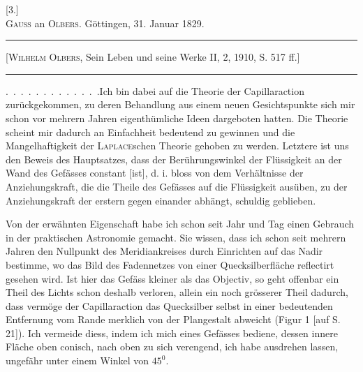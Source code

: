 \clearpage\begingroup{}
\begin{center}
[3.]\\[.7em]
\textsc{Gauss} an \textsc{Olbers}. Göttingen, 31. Januar 1829.
\par\medskip\rule{\textwidth}{.35pt}\par
{\small [\textsc{Wilhelm Olbers}, Sein Leben und seine Werke II, 2, 1910, S. 517 ff.]}\par
\rule{\textwidth}{.35pt}
\end{center}
\noindent .\ .\ .\ .\ .\ .\ .\ .\ .\ .\ .\ .\ .\quad Ich bin dabei auf die Theorie der Capillaraction
zurückgekommen, zu deren Behandlung aus einem neuen Gesichtspunkte sich
mir schon vor mehrern Jahren eigenthümliche Ideen dargeboten hatten. Die
Theorie scheint mir dadurch an Einfachheit bedeutend zu gewinnen und die
Mangelhaftigkeit der \textsc{Laplace}schen Theorie gehoben zu werden. Letztere
ist uns den Beweis des Hauptsatzes, dass der Berührungswinkel der Flüssigkeit
an der Wand des Gefässes constant [ist], d. i. bloss von dem Verhältnisse
der Anziehungskraft, die die Theile des Gefässes auf die Flüssigkeit ausüben,
zu der Anziehungskraft der erstern gegen einander abhängt, schuldig
geblieben.

Von der erwähnten Eigenschaft habe ich schon seit Jahr und Tag einen
Gebrauch in der praktischen Astronomie gemacht. Sie wissen, dass ich schon
seit mehrern Jahren den Nullpunkt des Meridiankreises durch Einrichten auf
das Nadir bestimme, wo das Bild des Fadennetzes von einer Quecksilberfläche
reflectirt gesehen wird. Ist hier das Gefäss kleiner als das Objectiv, so geht
offenbar ein Theil des Lichts schon deshalb verloren, allein ein noch grösserer
Theil dadurch, dass vermöge der Capillaraction das Quecksilber selbst in einer
bedeutenden Entfernung vom Rande merklich von der Plangestalt abweicht
(Figur 1 [auf S. 21]). Ich vermeide diess, indem ich mich eines Gefässes bediene,
dessen innere Fläche oben conisch, nach oben zu sich verengend, ich
habe ausdrehen lassen, ungefähr unter einem Winkel von \(45^{0}\).

